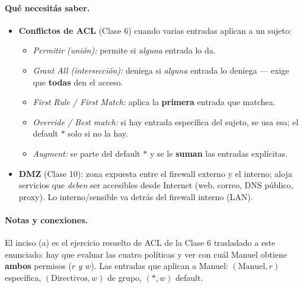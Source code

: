 \paragraph{Qué necesitás saber.}
\begin{itemize}
  \item \textbf{Conflictos de ACL} (Clase 6) cuando varias entradas aplican a un sujeto:
  \begin{itemize}
    \item \emph{Permitir (unión):} permite si \emph{alguna} entrada lo da.
    \item \emph{Grant All (intersección):} deniega si \emph{alguna} entrada lo deniega — exige que \textbf{todas} den el acceso.
    \item \emph{First Rule / First Match:} aplica la \textbf{primera} entrada que matchea.
    \item \emph{Override / Best match:} si hay entrada específica del sujeto, se usa esa; el default $\ast$ solo si no la hay.
    \item \emph{Augment:} se parte del default $\ast$ y se le \textbf{suman} las entradas explícitas.
  \end{itemize}
  \item \textbf{DMZ} (Clase 10): zona expuesta entre el firewall externo y el interno; aloja servicios que \emph{deben} ser accesibles desde Internet (web, correo, DNS público, proxy). Lo interno/sensible va detrás del firewall interno (LAN).
\end{itemize}

\paragraph{Notas y conexiones.}
El inciso (a) es el ejercicio resuelto de ACL de la Clase 6 trasladado a este enunciado: hay que evaluar las cuatro políticas y ver con cuál Manuel obtiene \textbf{ambos} permisos ($r$ \emph{y} $w$). Las entradas que aplican a Manuel: $(\text{Manuel},r)$ específica, $(\text{Directivos},w)$ de grupo, $(\ast,w)$ default.

